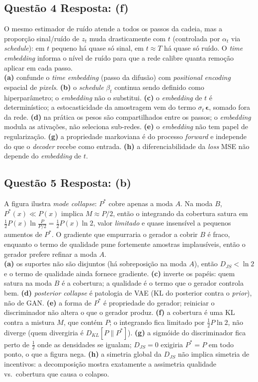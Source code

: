 \documentclass[11pt,a4paper]{article}
\begin{document}
\subsection*{Questão 4 \textemdash{} Resposta: (f)}
O mesmo estimador de ruído atende a todos os passos da cadeia, mas a proporção sinal/ruído de $z_t$ muda drasticamente com $t$ (controlada por $\alpha_t$ via \textit{schedule}): em $t$ pequeno há quase só sinal, em $t \approx T$ há quase só ruído. O \textit{time embedding} informa o nível de ruído para que a rede calibre quanta remoção aplicar em cada passo.\\
\textbf{(a)} confunde o \textit{time embedding} (passo da difusão) com \textit{positional encoding} espacial de \textit{pixels}.
\textbf{(b)} o \textit{schedule} $\beta_t$ continua sendo definido como hiperparâmetro; o \textit{embedding} não o substitui.
\textbf{(c)} o \textit{embedding} de $t$ é determinístico; a estocasticidade da amostragem vem do termo $\sigma_t\,\boldsymbol{\epsilon}$, somado fora da rede.
\textbf{(d)} na prática os pesos são compartilhados entre os passos; o \textit{embedding} modula as ativações, não seleciona sub-redes.
\textbf{(e)} o \textit{embedding} não tem papel de regularização.
\textbf{(g)} a propriedade markoviana é do processo \textit{forward} e independe do que o \textit{decoder} recebe como entrada.
\textbf{(h)} a diferenciabilidade da \emph{loss} MSE não depende do \textit{embedding} de $t$.

\subsection*{Questão 5 \textemdash{} Resposta: (b)}
A figura ilustra \textit{mode collapse}: $P^{*}$ cobre apenas a moda $A$. Na moda $B$, $P^{*}(x) \ll P(x)$ implica $M \approx P/2$, então o integrando da cobertura satura em $\tfrac{1}{2}P(x)\ln\!\tfrac{P}{P/2} = \tfrac{1}{2}P(x)\ln 2$, valor \emph{limitado} e quase insensível a pequenos aumentos de $P^{*}$. O gradiente que empurraria o gerador a cobrir $B$ é fraco, enquanto o termo de qualidade pune fortemente amostras implausíveis, então o gerador prefere refinar a moda $A$.\\
\textbf{(a)} os suportes não são disjuntos (há sobreposição na moda $A$), então $D_{JS} < \ln 2$ e o termo de qualidade ainda fornece gradiente.
\textbf{(c)} inverte os papéis: quem satura na moda $B$ é a cobertura; a qualidade é o termo que o gerador controla bem.
\textbf{(d)} \textit{posterior collapse} é patologia de VAE (KL do posterior contra o \textit{prior}), não de GAN.
\textbf{(e)} a forma de $P^{*}$ é propriedade do gerador; reiniciar o discriminador não altera o que o gerador produz.
\textbf{(f)} a cobertura é uma KL contra a mistura $M$, que contém $P$; o integrando fica limitado por $\tfrac{1}{2}P\ln 2$, não diverge (quem divergiria é $D_{KL}[P\|P^{*}]$).
\textbf{(g)} a sigmóide do discriminador fica perto de $\tfrac{1}{2}$ onde as densidades se igualam; $D_{JS} = 0$ exigiria $P^{*} = P$ em todo ponto, o que a figura nega.
\textbf{(h)} a simetria global da $D_{JS}$ não implica simetria de incentivos: a decomposição mostra exatamente a assimetria qualidade vs.\ cobertura que causa o colapso.
\end{document}
